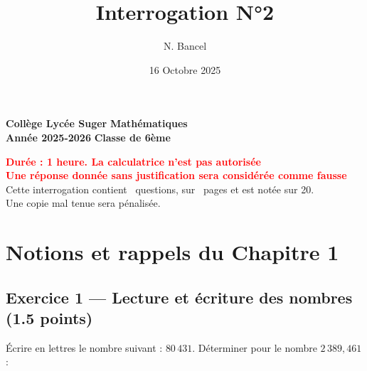\documentclass{exam}
\title{Interrogation N°2}
\author{N. Bancel}
\date{16 Octobre 2025}
\begin{document}
\textbf{Collège Lycée Suger}
\hfill
\textbf{Mathématiques} \\

\textbf{Année 2025-2026}
\hfill
\textbf{Classe de 6ème} \par

{\let\newpage\relax\maketitle}

\begin{center}
\textbf{\textcolor{red}{Durée : 1 heure. La calculatrice n'est pas autorisée}} \\
\textbf{\textcolor{red}{Une réponse donnée sans justification sera considérée comme fausse}} \\
Cette interrogation contient \numquestions\ questions, sur \numpages\ pages et est notée sur 20. \\
Une copie mal tenue sera pénalisée.

\end{center}

\section*{Notions et rappels du Chapitre 1}

\subsection*{Exercice 1 — Lecture et écriture des nombres (1.5 points)}

\begin{questions}
  \question[0.5] Écrire en lettres le nombre suivant : \quad $80\,431$.
  \question[1] Déterminer pour le nombre $2\,389,461$ :
\end{questions}
\end{document}
